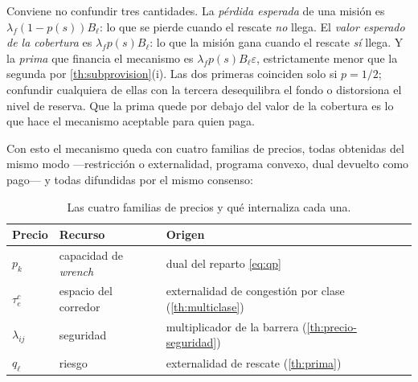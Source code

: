 \begin{observacion}
\label{obs:prima}
Conviene no confundir tres cantidades. La \emph{pérdida esperada} de una misión
es $\lambda_f(1-p(s))B_\ell$: lo que se pierde cuando el rescate \emph{no} llega.
El \emph{valor esperado de la cobertura} es $\lambda_f p(s)B_\ell$: lo que la
misión gana cuando el rescate \emph{sí} llega. Y la \emph{prima} que financia el
mecanismo es $\lambda_f p(s)B_\ell\varepsilon$, estrictamente menor que la
segunda por \cref{th:subprovision}(i). Las dos primeras coinciden solo si
$p=1/2$; confundir cualquiera de ellas con la tercera desequilibra el fondo o
distorsiona el nivel de reserva. Que la prima quede por debajo del valor de la
cobertura es lo que hace el mecanismo aceptable para quien paga.
\end{observacion}

Con esto el mecanismo queda con cuatro familias de precios, todas obtenidas del
mismo modo —restricción o externalidad, programa convexo, dual devuelto como
pago— y todas difundidas por el mismo consenso:

\begin{table}[!ht]
\centering\small
\caption{Las cuatro familias de precios y qué internaliza cada una.}
\label{tab:precios}
\begin{tabularx}{\textwidth}{@{}llX@{}}
\toprule
Precio & Recurso & Origen \\
\midrule
$p_k$ & capacidad de \emph{wrench} & dual del reparto \eqref{eq:qp} \\
$\tau^c_e$ & espacio del corredor & externalidad de congestión por clase (\cref{th:multiclase}) \\
$\lambda_{ij}$ & seguridad & multiplicador de la barrera (\cref{th:precio-seguridad}) \\
$q_\ell$ & riesgo & externalidad de rescate (\cref{th:prima}) \\
\bottomrule
\end{tabularx}
\end{table}

